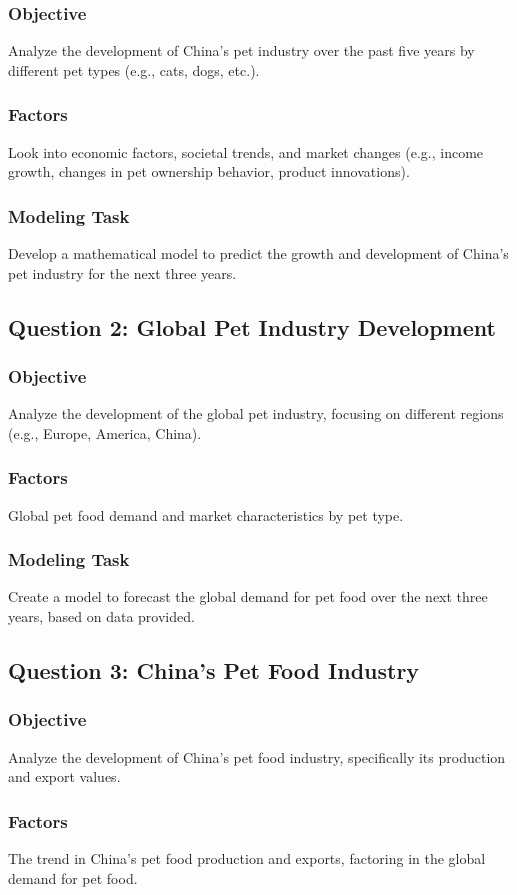 \documentclass[withoutpreface,bwprint]{cumcmthesis} %
\begin{document}
\subsubsection{Objective}
Analyze the development of China's pet industry over the past five years by different pet types (e.g., cats, dogs, etc.).
\subsubsection{Factors}
Look into economic factors, societal trends, and market changes (e.g., income growth, changes in pet ownership behavior, product innovations).
\subsubsection{Modeling Task}
Develop a mathematical model to predict the growth and development of China's pet industry for the next three years.
\subsection{Question 2: Global Pet Industry Development}
\subsubsection{Objective}
Analyze the development of the global pet industry, focusing on different regions (e.g., Europe, America, China).
\subsubsection{Factors}
Global pet food demand and market characteristics by pet type.
\subsubsection{Modeling Task}
Create a model to forecast the global demand for pet food over the next three years, based on data provided.
\subsection{Question 3: China's Pet Food Industry}
\subsubsection{Objective}
Analyze the development of China's pet food industry, specifically its production and export values.
\subsubsection{Factors}
The trend in China's pet food production and exports, factoring in the global demand for pet food.
\end{document}

